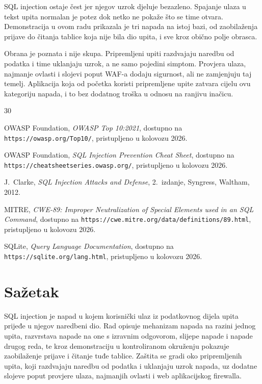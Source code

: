 \documentclass{mathos}
\begin{document}
\noindent
SQL injection ostaje čest jer njegov uzrok djeluje bezazleno. Spajanje ulaza u tekst upita normalan je potez dok netko ne pokaže što se time otvara. Demonstracija u ovom radu prikazala je tri napada na istoj bazi, od zaobilaženja prijave do čitanja tablice koja nije bila dio upita, i sve kroz obično polje obrasca.

Obrana je poznata i nije skupa. Pripremljeni upiti razdvajaju naredbu od podatka i time uklanjaju uzrok, a ne samo pojedini simptom. Provjera ulaza, najmanje ovlasti i slojevi poput WAF-a dodaju sigurnost, ali ne zamjenjuju taj temelj. Aplikacija koja od početka koristi pripremljene upite zatvara cijelu ovu kategoriju napada, i to bez dodatnog troška u odnosu na ranjivu inačicu.


\begin{thebibliography}{30}

{\sc OWASP Foundation}, {\em OWASP Top 10:2021}, dostupno na \verb|https://owasp.org/Top10/|, pristupljeno u kolovozu 2026.

{\sc OWASP Foundation}, {\em SQL Injection Prevention Cheat Sheet}, dostupno na \verb|https://cheatsheetseries.owasp.org/|, pristupljeno u kolovozu 2026.

{\sc J.~Clarke}, {\em SQL Injection Attacks and Defense}, 2.\ izdanje, Syngress, Waltham, 2012.

{\sc MITRE}, {\em CWE-89: Improper Neutralization of Special Elements used in an SQL Command}, dostupno na \verb|https://cwe.mitre.org/data/definitions/89.html|, pristupljeno u kolovozu 2026.

{\sc SQLite}, {\em Query Language Documentation}, dostupno na \verb|https://sqlite.org/lang.html|, pristupljeno u kolovozu 2026.
\end{thebibliography}


\chapter*{Sažetak}

SQL injection je napad u kojem korisnički ulaz iz podatkovnog dijela upita prijeđe u njegov naredbeni dio. Rad opisuje mehanizam napada na razini jednog upita, razvrstava napade na one s izravnim odgovorom, slijepe napade i napade drugog reda, te kroz demonstraciju u kontroliranom okruženju pokazuje zaobilaženje prijave i čitanje tuđe tablice. Zaštita se gradi oko pripremljenih upita, koji razdvajaju naredbu od podatka i uklanjaju uzrok napada, uz dodatne slojeve poput provjere ulaza, najmanjih ovlasti i web aplikacijskog firewalla.
\end{document}
